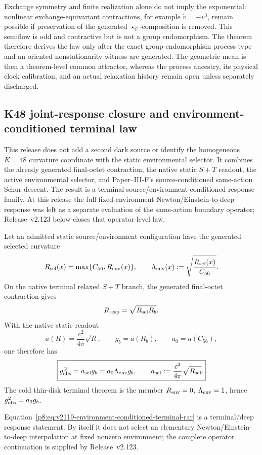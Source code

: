 \documentclass[12pt,a4paper]{article}
\begin{document}
\begin{remark}
\label{p8:rem:born-balance-continuation-scope}
Exchange symmetry and finite realization alone do not imply the exponential:
nonlinear exchange-equivariant contractions, for example
\(\dot v=-v^3\), remain possible if preservation of the generated
\(\star_C\)-composition is removed.  This semiflow is odd and contractive but
is not a group endomorphism.  The theorem therefore derives the law only after
the exact group-endomorphism process type and an oriented nonstationarity
witness are generated.  The geometric mean is
then a theorem-level common attractor, whereas the process ancestry, its
physical clock calibration, and an actual relaxation history remain open
unless separately discharged.
\end{remark}


\subsection{K48 joint-response closure and environment-conditioned terminal law}
\label{p8:sec:v2119-k48-joint-response}
This release does not add a second dark source or identify the homogeneous
$K=48$ curvature coordinate with the static environmental selector.  It
combines the already generated final-octet contraction, the native static
$S+T$ readout, the active environmental selector, and Paper--III-F's
source-conditioned same-action Schur descent.  The result is a terminal
source/environment-conditioned response family.  At this release the full
fixed-environment Newton/Einstein-to-deep response was left as a separate
evaluation of the same-action boundary operator; Release~v2.123 below closes
that operator-level law.

\begin{corollary}
\label{p8:cor:v2119-environment-conditioned-terminal-rar}
Let an admitted static source/environment configuration have the generated
selected curvature
\[
 R_{\rm sel}(x)=\max\{C_{56},R_{\rm env}(x)\},
 \qquad
 \Lambda_{\rm env}(x):=\sqrt{\frac{R_{\rm sel}(x)}{C_{56}}}.
\]
On the native terminal relaxed $S+T$ branch, the generated final-octet
contraction gives
\[
 R_{\rm resp}=\sqrt{R_{\rm sel}R_b}.
\]
With the native static readout
\[
 a(R)=\frac{c^2}{4\pi}\sqrt R,
 \qquad
 g_b=a(R_b),
 \qquad
 a_0=a(C_{56}),
\]
one therefore has
\begin{equation}
 \label{p8:eq:v2119-environment-conditioned-terminal-rar}
 \boxed{
 g_{\rm obs}^{\,2}
 =a_{\rm sel}g_b
 =a_0\Lambda_{\rm env}g_b,
 \qquad
 a_{\rm sel}:=\frac{c^2}{4\pi}\sqrt{R_{\rm sel}}.}
\end{equation}
The cold thin-disk terminal theorem is the member $R_{\rm env}=0$,
$\Lambda_{\rm env}=1$, hence $g_{\rm obs}^2=a_0g_b$.

Equation~\eqref{p8:eq:v2119-environment-conditioned-terminal-rar} is a
terminal/deep response statement.  By itself it does not select an elementary
Newton/Einstein-to-deep interpolation at fixed nonzero environment; the
complete operator continuation is supplied by Release~v2.123.
\end{corollary}
\end{document}
